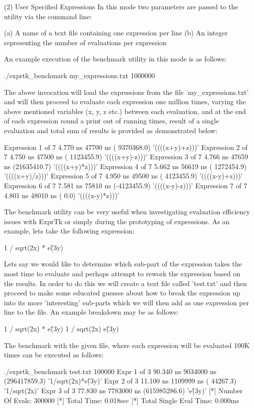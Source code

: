 {(2) User Specified Expressions
In this mode two parameters are passed to the utility via the  command
line:

(a) A name of a text file containing one expression per line
(b) An integer representing the number of evaluations per expression


An  example execution  of the  benchmark utility  in this  mode is  as
follows:

./exprtk\_benchmark my\_expressions.txt 1000000


The  above  invocation  will  load  the  expressions  from  the   file
'my\_expressions.txt' and will then proceed to evaluate each expression
one million  times, varying  the above  mentioned variables  (x, y,  z
etc.) between each evaluation, and at the end of each expression round
a print out of  running times, result of a single evaluation and total
sum of results is provided as demonstrated below:

Expression 1 of 7 4.770 ns 47700 ns  ( 9370368.0) '((((x+y)+z)))'
Expression 2 of 7 4.750 ns 47500 ns  ( 1123455.9) '((((x+y)-z)))'
Expression 3 of 7 4.766 ns 47659 ns  (21635410.7) '((((x+y)*z)))'
Expression 4 of 7 5.662 ns 56619 ns  ( 1272454.9) '((((x+y)/z)))'
Expression 5 of 7 4.950 ns 49500 ns  ( 4123455.9) '((((x-y)+z)))'
Expression 6 of 7 7.581 ns 75810 ns  (-4123455.9) '((((x-y)-z)))'
Expression 7 of 7 4.801 ns 48010 ns  (       0.0) '((((x-y)*z)))'


The benchmark utility can be very useful when investigating evaluation
efficiency  issues with  ExprTk or  simply during  the prototyping  of
expressions. As an example, lets take the following expression:

1 / sqrt(2x) * e\^(3y)


Lets say we would like to determine which sub-part  of the  expression
takes the  most time  to evaluate  and perhaps  attempt to  rework the
expression based on the results. In order to do this we will create  a
text file  called 'test.txt'  and then  proceed to  make some educated
guesses  about  how  to  break   the  expression  up  into  its   more
'interesting' sub-parts which we will  then add as one expression  per
line to the file. An example breakdown may be as follows:

1 / sqrt(2x) * e\^(3y)
1 / sqrt(2x)
e\^(3y)


The  benchmark with  the given  file, where  each expression  will be
evaluated 100K times can be executed as follows:

./exprtk\_benchmark test.txt 100000
Expr 1 of 3 90.340 ns 9034000 ns (296417859.3) '1/sqrt(2x)*e\^(3y)'
Expr 2 of 3 11.100 ns 1109999 ns (    44267.3) '1/sqrt(2x)'
Expr 3 of 3 77.830 ns 7783000 ns (615985286.6) 'e\^(3y)'
[*] Number Of Evals:         300000
[*] Total Time:              0.018sec
[*] Total Single Eval Time:  0.000ms


}
